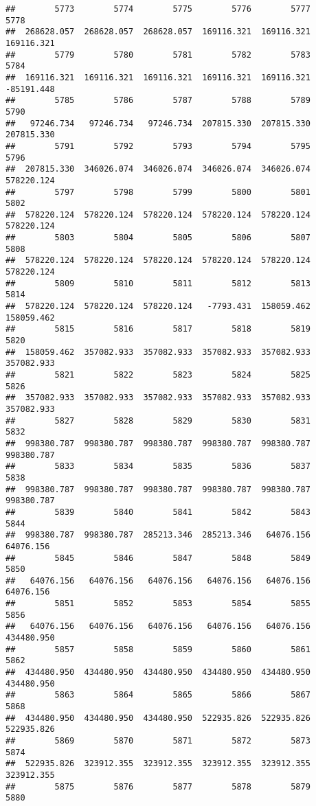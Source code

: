 \documentclass[
]{book}
\begin{document}
\begin{verbatim}
##        5773        5774        5775        5776        5777        5778 
##  268628.057  268628.057  268628.057  169116.321  169116.321  169116.321 
##        5779        5780        5781        5782        5783        5784 
##  169116.321  169116.321  169116.321  169116.321  169116.321  -85191.448 
##        5785        5786        5787        5788        5789        5790 
##   97246.734   97246.734   97246.734  207815.330  207815.330  207815.330 
##        5791        5792        5793        5794        5795        5796 
##  207815.330  346026.074  346026.074  346026.074  346026.074  578220.124 
##        5797        5798        5799        5800        5801        5802 
##  578220.124  578220.124  578220.124  578220.124  578220.124  578220.124 
##        5803        5804        5805        5806        5807        5808 
##  578220.124  578220.124  578220.124  578220.124  578220.124  578220.124 
##        5809        5810        5811        5812        5813        5814 
##  578220.124  578220.124  578220.124   -7793.431  158059.462  158059.462 
##        5815        5816        5817        5818        5819        5820 
##  158059.462  357082.933  357082.933  357082.933  357082.933  357082.933 
##        5821        5822        5823        5824        5825        5826 
##  357082.933  357082.933  357082.933  357082.933  357082.933  357082.933 
##        5827        5828        5829        5830        5831        5832 
##  998380.787  998380.787  998380.787  998380.787  998380.787  998380.787 
##        5833        5834        5835        5836        5837        5838 
##  998380.787  998380.787  998380.787  998380.787  998380.787  998380.787 
##        5839        5840        5841        5842        5843        5844 
##  998380.787  998380.787  285213.346  285213.346   64076.156   64076.156 
##        5845        5846        5847        5848        5849        5850 
##   64076.156   64076.156   64076.156   64076.156   64076.156   64076.156 
##        5851        5852        5853        5854        5855        5856 
##   64076.156   64076.156   64076.156   64076.156   64076.156  434480.950 
##        5857        5858        5859        5860        5861        5862 
##  434480.950  434480.950  434480.950  434480.950  434480.950  434480.950 
##        5863        5864        5865        5866        5867        5868 
##  434480.950  434480.950  434480.950  522935.826  522935.826  522935.826 
##        5869        5870        5871        5872        5873        5874 
##  522935.826  323912.355  323912.355  323912.355  323912.355  323912.355 
##        5875        5876        5877        5878        5879        5880 

\end{verbatim}
\end{document}
